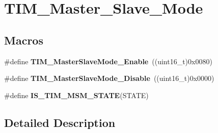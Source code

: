\hypertarget{group___t_i_m___master___slave___mode}{\section{T\-I\-M\-\_\-\-Master\-\_\-\-Slave\-\_\-\-Mode}
\label{group___t_i_m___master___slave___mode}
}
\subsection*{Macros}
\begin{DoxyCompactItemize}
\item 
\hypertarget{group___t_i_m___master___slave___mode_gaef5da910ae6952fce424b440ea39f69a}{\#define {\bfseries T\-I\-M\-\_\-\-Master\-Slave\-Mode\-\_\-\-Enable}~((uint16\-\_\-t)0x0080)}\label{group___t_i_m___master___slave___mode_gaef5da910ae6952fce424b440ea39f69a}

\item 
\hypertarget{group___t_i_m___master___slave___mode_ga8d4c7c0f57469f384b1327bb323d28a3}{\#define {\bfseries T\-I\-M\-\_\-\-Master\-Slave\-Mode\-\_\-\-Disable}~((uint16\-\_\-t)0x0000)}\label{group___t_i_m___master___slave___mode_ga8d4c7c0f57469f384b1327bb323d28a3}

\item 
\#define {\bfseries I\-S\-\_\-\-T\-I\-M\-\_\-\-M\-S\-M\-\_\-\-S\-T\-A\-T\-E}(S\-T\-A\-T\-E)
\end{DoxyCompactItemize}


\subsection{Detailed Description}


